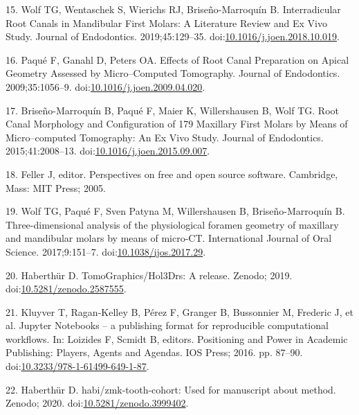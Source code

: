 \documentclass[
  american,
]{article}
\newenvironment{cslreferences}%
  {}%
  {\par}
\begin{document}
\begin{cslreferences}
\leavevmode\hypertarget{ref-amSKhLb1}{}%
15. Wolf TG, Wentaschek S, Wierichs RJ, Briseño-Marroquín B. Interradicular Root Canals in Mandibular First Molars: A Literature Review and Ex Vivo Study. Journal of Endodontics. 2019;45:129--35. doi:\href{https://doi.org/10.1016/j.joen.2018.10.019}{10.1016/j.joen.2018.10.019}.

\leavevmode\hypertarget{ref-DLVCfdzK}{}%
16. Paqué F, Ganahl D, Peters OA. Effects of Root Canal Preparation on Apical Geometry Assessed by Micro--Computed Tomography. Journal of Endodontics. 2009;35:1056--9. doi:\href{https://doi.org/10.1016/j.joen.2009.04.020}{10.1016/j.joen.2009.04.020}.

\leavevmode\hypertarget{ref-ZTgDEakx}{}%
17. Briseño-Marroquín B, Paqué F, Maier K, Willershausen B, Wolf TG. Root Canal Morphology and Configuration of 179 Maxillary First Molars by Means of Micro--computed Tomography: An Ex Vivo Study. Journal of Endodontics. 2015;41:2008--13. doi:\href{https://doi.org/10.1016/j.joen.2015.09.007}{10.1016/j.joen.2015.09.007}.

\leavevmode\hypertarget{ref-11csWtgxP}{}%
18. Feller J, editor. Perspectives on free and open source software. Cambridge, Mass: MIT Press; 2005.

\leavevmode\hypertarget{ref-1Gn1pVZXt}{}%
19. Wolf TG, Paqué F, Sven Patyna M, Willershausen B, Briseño-Marroquín B. Three-dimensional analysis of the physiological foramen geometry of maxillary and mandibular molars by means of micro-CT. International Journal of Oral Science. 2017;9:151--7. doi:\href{https://doi.org/10.1038/ijos.2017.29}{10.1038/ijos.2017.29}.

\leavevmode\hypertarget{ref-115PPSuQp}{}%
20. Haberthür D. TomoGraphics/Hol3Drs: A release. Zenodo; 2019. doi:\href{https://doi.org/10.5281/zenodo.2587555}{10.5281/zenodo.2587555}.

\leavevmode\hypertarget{ref-pQ6Wbz73}{}%
21. Kluyver T, Ragan-Kelley B, Pérez F, Granger B, Bussonnier M, Frederic J, et al. Jupyter Notebooks -- a publishing format for reproducible computational workflows. In: Loizides F, Scmidt B, editors. Positioning and Power in Academic Publishing: Players, Agents and Agendas. IOS Press; 2016. pp. 87--90. doi:\href{https://doi.org/10.3233/978-1-61499-649-1-87}{10.3233/978-1-61499-649-1-87}.

\leavevmode\hypertarget{ref-tZRGGuMm}{}%
22. Haberthür D. habi/zmk-tooth-cohort: Used for manuscript about method. Zenodo; 2020. doi:\href{https://doi.org/10.5281/zenodo.3999402}{10.5281/zenodo.3999402}.


\end{cslreferences}
\end{document}

